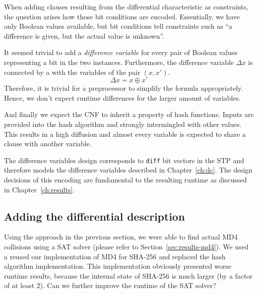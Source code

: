 When adding clauses resulting from
the differential characteristic as constraints, the question arises how those
bit conditions are encoded. Essentially, we have only Boolean values available,
but bit conditions tell constraints such as \enquote{a difference is given,
but the actual value is unknown}.

It seemed trivial to add a \emph{difference variable} for every pair of Boolean
values representing a bit in the two instances. Furthermore, the difference
variable $\Delta x$ is connected by a  with the variables of the pair $(x, x')$.
\[ \Delta x = x \oplus x' \]
Therefore, it is trivial for a preprocessor to simplify the formula
appropriately. Hence, we don't expect runtime differences for the larger
amount of variables.

And finally we expect the CNF to inherit a property of hash functions.
Inputs are provided into the hash algorithm and strongly intermingled
with other values. This results in a high diffusion and almost every
variable is expected to share a clause with another variable.

The difference variables design corresponds to \texttt{diff} bit vectors
in the STP and therefore models the difference variables described
in Chapter~\ref{ch:dc}.
The design decisions of this encoding are fundamental to the resulting
runtime as discussed in Chapter~\ref{ch:results}.

\subsection{Adding the differential description}
\label{sec:enc-diff-desc}
%
Using the approach in the previous section, we were able to find actual MD4 collisions
using a SAT solver (please refer to Section~\ref{sec:results-md4}).
We used a reused our implementation of MD4 for SHA-256 and replaced the hash algorithm
implementation. This implementation obviously presented worse
runtime results, because the internal state of SHA-256 is much larger
(by a factor of at least 2). Can we further improve the runtime of the SAT solver?


